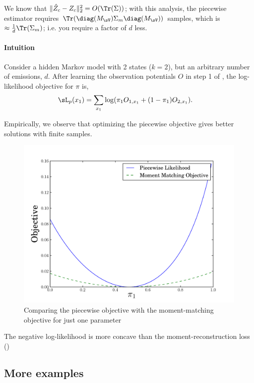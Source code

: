 We know that $\|\hat Z_c - Z_c\|^2_2 = O(\Tr(\Sigma))$; with this
analysis, the piecewise estimator requires $\Tr(\diag(M_\sV) \Sigma_m
\diag(M_\sV))$ samples, which is $\approx \frac{1}{d} \Tr(\Sigma_m)$;
i.e. you require a factor of $d$ less.

\paragraph{Intuition}

Consider a hidden Markov model  with
  2 states ($k=2$), but an arbitrary number of emissions, $d$. 
After learning the observation potentials $O$ in step 1 of
  , the log-likelihood objective for $\pi$ is,
\begin{align}
  \sL_p(x_1) &= \sum_{x_1} \log( \pi_1 O_{1,x_1} + (1-\pi_1) O_{2,x_1} ).
\end{align}

Empirically, we observe that optimizing the piecewise objective gives
  better solutions with finite samples.

\begin{figure}
  \centering
  \includegraphics[width=\columnwidth]{figures/piecewise-objective.pdf}
  \caption{Comparing the piecewise objective with the moment-matching objective for just one parameter}
  \label{fig:piecewise-objective}
\end{figure}

The negative log-likelihood is more concave than the moment-reconstruction loss ()

\subsection{More examples}


